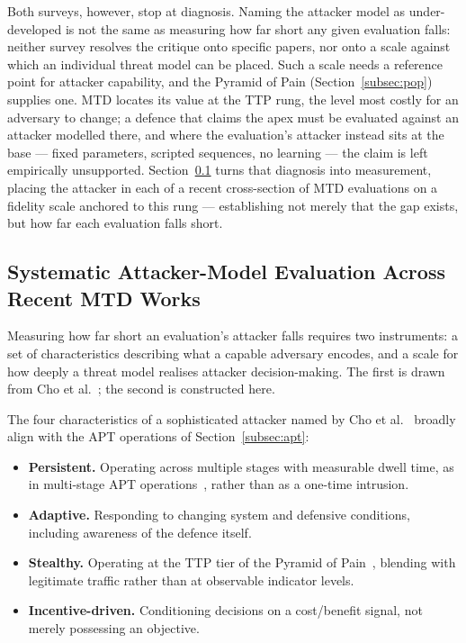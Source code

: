 Both surveys, however, stop at diagnosis. Naming the attacker model as under-developed is not the same as measuring how far short any given evaluation falls: neither survey resolves the critique onto specific papers, nor onto a scale against which an individual threat model can be placed. Such a scale needs a reference point for attacker capability, and the Pyramid of Pain (Section~\ref{subsec:pop}) supplies one. MTD locates its value at the TTP rung, the level most costly for an adversary to change; a defence that claims the apex must be evaluated against an attacker modelled there, and where the evaluation's attacker instead sits at the base --- fixed parameters, scripted sequences, no learning --- the claim is left empirically unsupported. Section~\ref{subsec:threat_model_eval} turns that diagnosis into measurement, placing the attacker in each of a recent cross-section of MTD evaluations on a fidelity scale anchored to this rung --- establishing not merely that the gap exists, but how far each evaluation falls short.

\subsection{Systematic Attacker-Model Evaluation Across Recent MTD Works}
\label{subsec:threat_model_eval}

Measuring how far short an evaluation's attacker falls requires two instruments: a set of characteristics describing what a capable adversary encodes, and a scale for how deeply a threat model realises attacker decision-making. The first is drawn from Cho et al.~\cite{cho2020}; the second is constructed here.

The four characteristics of a sophisticated attacker named by Cho et al.~\cite{cho2020} broadly align with the APT operations of Section~\ref{subsec:apt}:
\begin{itemize}
    \item \textbf{Persistent.} Operating across multiple stages with measurable dwell time, as in multi-stage APT operations~\cite{alshamrani2019}, rather than as a one-time intrusion.
    \item \textbf{Adaptive.} Responding to changing system and defensive conditions, including awareness of the defence itself.
    \item \textbf{Stealthy.} Operating at the TTP tier of the Pyramid of Pain~\cite{bianco2013}, blending with legitimate traffic rather than at observable indicator levels.
    \item \textbf{Incentive-driven.} Conditioning decisions on a cost/benefit signal, not merely possessing an objective.
\end{itemize}

